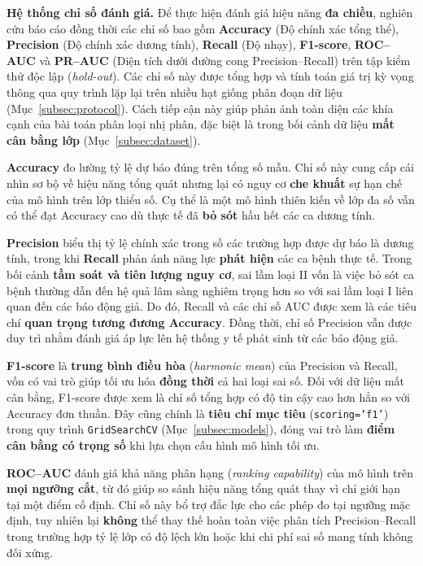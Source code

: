 \documentclass[14pt,a4paper]{extreport}
\begin{document}
\noindent\textbf{Hệ thống chỉ số đánh giá.} Để thực hiện đánh giá hiệu năng \textbf{đa chiều}, nghiên cứu báo cáo đồng thời các chỉ số bao gồm \textbf{Accuracy} (Độ chính xác tổng thể), \textbf{Precision} (Độ chính xác dương tính), \textbf{Recall} (Độ nhạy), \textbf{F1-score}, \textbf{ROC--AUC} và \textbf{PR--AUC} (Diện tích dưới đường cong Precision--Recall) trên tập kiểm thử độc lập (\textit{hold-out}). Các chỉ số này được tổng hợp và tính toán giá trị kỳ vọng thông qua quy trình lặp lại trên nhiều hạt giống phân đoạn dữ liệu (Mục~\ref{subsec:protocol}). Cách tiếp cận này giúp phản ánh toàn diện các khía cạnh của bài toán phân loại nhị phân, đặc biệt là trong bối cảnh dữ liệu \textbf{mất cân bằng lớp} (Mục~\ref{subsec:dataset}).

\textbf{Accuracy} đo lường tỷ lệ dự báo đúng trên tổng số mẫu. Chỉ số này cung cấp cái nhìn sơ bộ về hiệu năng tổng quát nhưng lại có nguy cơ \textbf{che khuất} sự hạn chế của mô hình trên lớp thiểu số. Cụ thể là một mô hình thiên kiến về lớp đa số vẫn có thể đạt Accuracy cao dù thực tế đã \textbf{bỏ sót} hầu hết các ca dương tính.

\textbf{Precision} biểu thị tỷ lệ chính xác trong số các trường hợp được dự báo là dương tính, trong khi \textbf{Recall} phản ánh năng lực \textbf{phát hiện} các ca bệnh thực tế. Trong bối cảnh \textbf{tầm soát và tiên lượng nguy cơ}, sai lầm loại II vốn là việc bỏ sót ca bệnh thường dẫn đến hệ quả lâm sàng nghiêm trọng hơn so với sai lầm loại I liên quan đến các báo động giả. Do đó, Recall và các chỉ số AUC được xem là các tiêu chí \textbf{quan trọng tương đương Accuracy}. Đồng thời, chỉ số Precision vẫn được duy trì nhằm đánh giá áp lực lên hệ thống y tế phát sinh từ các báo động giả.

\textbf{F1-score} là \textbf{trung bình điều hòa} (\textit{harmonic mean}) của Precision và Recall, vốn có vai trò giúp tối ưu hóa \textbf{đồng thời} cả hai loại sai số. Đối với dữ liệu mất cân bằng, F1-score được xem là chỉ số tổng hợp có độ tin cậy cao hơn hẳn so với Accuracy đơn thuần. Đây cũng chính là \textbf{tiêu chí mục tiêu} (\texttt{scoring='f1'}) trong quy trình \texttt{GridSearchCV} (Mục~\ref{subsec:models}), đóng vai trò làm \textbf{điểm cân bằng có trọng số} khi lựa chọn cấu hình mô hình tối ưu.

\textbf{ROC--AUC} đánh giá khả năng phân hạng (\textit{ranking capability}) của mô hình trên \textbf{mọi ngưỡng cắt}, từ đó giúp so sánh hiệu năng tổng quát thay vì chỉ giới hạn tại một điểm cố định. Chỉ số này bổ trợ đắc lực cho các phép đo tại ngưỡng mặc định, tuy nhiên lại \textbf{không} thể thay thế hoàn toàn việc phân tích Precision--Recall trong trường hợp tỷ lệ lớp có độ lệch lớn hoặc khi chi phí sai số mang tính không đối xứng.
\end{document}
